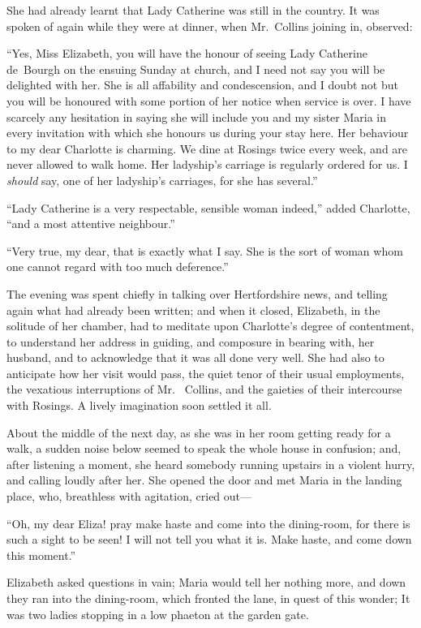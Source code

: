 She had already learnt that Lady Catherine was still in the
country.  It was spoken of again while they were at dinner,
when Mr.\ Collins joining in, observed:

``Yes, Miss Elizabeth, you will have the honour of seeing Lady
Catherine de~Bourgh on the ensuing Sunday at church, and I
need not say you will be delighted with her.  She is all affability
and condescension, and I doubt not but you will be honoured
with some portion of her notice when service is over.  I have
scarcely any hesitation in saying she will include you and my
sister Maria in every invitation with which she honours us during
your stay here.  Her behaviour to my dear Charlotte is charming.
We dine at Rosings twice every week, and are never allowed to
walk home.  Her ladyship's carriage is regularly ordered for us.
I \emph{should} say, one of her ladyship's carriages, for she has
several.''

``Lady Catherine is a very respectable, sensible woman indeed,''
added Charlotte, ``and a most attentive neighbour.''

``Very true, my dear, that is exactly what I say.  She is the sort
of woman whom one cannot regard with too much deference.''

The evening was  spent chiefly in talking over Hertfordshire
news, and telling again what had already been written; and when
it closed, Elizabeth, in the solitude of her chamber, had to
meditate upon Charlotte's degree of contentment, to understand
her address in guiding, and composure in bearing with, her
husband, and to acknowledge that it was all done very well.  She
had also to anticipate how her visit would pass, the quiet tenor
of their usual employments, the vexatious interruptions of Mr.\ %
Collins, and the gaieties of their intercourse with Rosings.
A lively imagination soon settled it all.

About the middle of the next day, as she was in her room getting
ready for a walk, a sudden noise below seemed to speak the
whole house in confusion; and, after listening a moment, she
heard somebody running upstairs in a violent hurry, and calling
loudly after her.  She opened the door and met Maria in the
landing place, who, breathless with agitation, cried out---

``Oh, my dear Eliza! pray make haste and come into the dining-room,
for there is such a sight to be seen!  I will not tell you what
it is.  Make haste, and come down this moment.''

Elizabeth asked questions in vain; Maria would tell her nothing
more, and down they ran into the dining-room, which fronted
the lane, in quest of this wonder; It was two ladies stopping in
a low phaeton at the garden gate.

